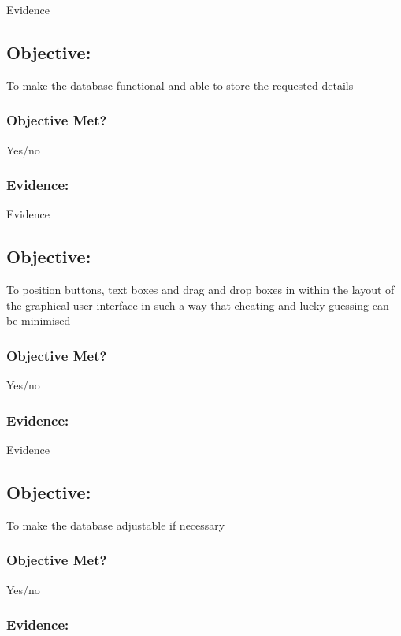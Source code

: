 Evidence

\subsection{Objective: }

To make the database functional and able to store the requested details

\subsubsection{Objective Met?}

Yes/no 

\subsubsection{Evidence: }

Evidence

\subsection{Objective: }

To position buttons, text boxes and drag and drop boxes in within the layout of the graphical user interface in such a way that cheating and lucky guessing can be minimised

\subsubsection{Objective Met?}

Yes/no 

\subsubsection{Evidence: }

Evidence

\subsection{Objective: }

To make the database adjustable if necessary

\subsubsection{Objective Met?}

Yes/no 

\subsubsection{Evidence: }

